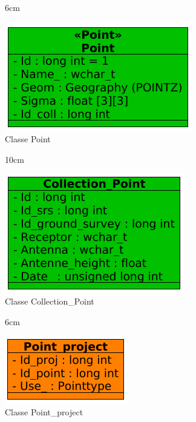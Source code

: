 \begin{figure}[!ht]{6cm}
  \caption{Classe Point} \label{point}
  \centering
  \includegraphics[width=1\hsize]{figuras/30.png}
\end{figure}

\begin{figure}[!ht]{10cm}
  \caption{Classe Collection\_Point} \label{collpoint}
  \centering
  \includegraphics[width=0.6\hsize]{figuras/29.png}
\end{figure}

\begin{figure}[!ht]{6cm}
  \caption{Classe Point\_project} \label{pointpro}
  \centering
  \includegraphics[width=0.8\hsize]{figuras/22.png}
\end{figure}

